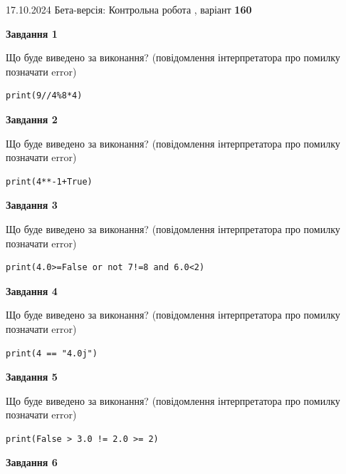 \documentclass[12pt, ukrainian]{article}
\begin{document}
{\Large{17.10.2024 Бета-версія: Контрольна робота , варіант  \No \textbf { 160 }\par}}
{
\begin {large}
{\begin {center}\textbf{Завдання 1}\end {center}}

Що буде виведено за виконання? (повідомлення інтерпретатора про помилку позначати error)\par
\begin{verbatim}
print(9//4%8*4)
\end{verbatim}

{\begin {center}\textbf{Завдання 2}\end {center}}

Що буде виведено за виконання? (повідомлення інтерпретатора про помилку позначати error)\par
\begin{verbatim}
print(4**-1+True)
\end{verbatim}

{\begin {center}\textbf{Завдання 3}\end {center}}

Що буде виведено за виконання? (повідомлення інтерпретатора про помилку позначати error)\par
\begin{verbatim}
print(4.0>=False or not 7!=8 and 6.0<2)
\end{verbatim}

{\begin {center}\textbf{Завдання 4}\end {center}}

Що буде виведено за виконання? (повідомлення інтерпретатора про помилку позначати error)\par
\begin{verbatim}
print(4 == "4.0j")
\end{verbatim}

{\begin {center}\textbf{Завдання 5}\end {center}}

Що буде виведено за виконання? (повідомлення інтерпретатора про помилку позначати error)\par
\begin{verbatim}
print(False > 3.0 != 2.0 >= 2)
\end{verbatim}

{\begin {center}\textbf{Завдання 6}\end {center}}


\end{large}}
\end{document}
